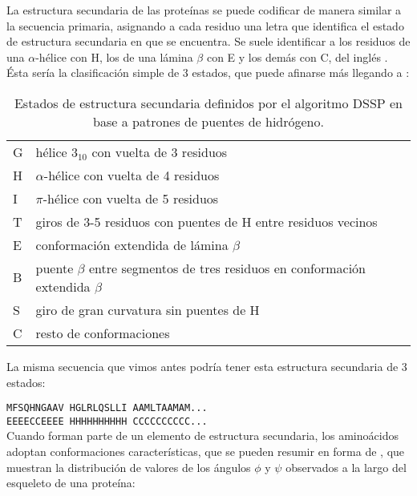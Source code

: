 La estructura secundaria de las prote\'{i}nas se puede codificar
de manera similar a la secuencia primaria, asignando a cada residuo una letra que identifica el estado de estructura secundaria en que se encuentra. 
Se suele identificar a los residuos de una $\alpha$-h\'{e}lice con H, los de una l\'{a}mina \(\beta\) con E y los dem\'{a}s 
con C, del ingl\'{e}s . \'{E}sta ser\'{i}a la clasificaci\'{o}n simple de 3 estados,
que puede afinarse m\'{a}s llegando a :

\begin{table}[h]
\begin{center}
\begin{scriptsize}
\begin{tabular}{|l|l|}\hline
G & h\'{e}lice $3_{10}$ con vuelta de 3 residuos\\   
H & $\alpha$-h\'{e}lice con vuelta de 4 residuos\\
I & $\pi$-h\'{e}lice con vuelta de 5 residuos\\ 
T & giros de 3-5 residuos con puentes de H entre residuos vecinos\\  
E & conformaci\'{o}n extendida de l\'{a}mina \(\beta\)\\
B & puente $\beta$ entre segmentos de tres residuos en conformaci\'{o}n extendida $\beta$\\      
S & giro de gran curvatura sin puentes de H\\    
C & resto de conformaciones\\   
\end{tabular}
\end{scriptsize}
\end{center}
\caption%
{
Estados de estructura secundaria definidos por el algoritmo DSSP en base a patrones de puentes de hidr\'{o}geno.
}
\label{tab:SS8}
\end{table} 

La misma secuencia que vimos antes podr\'{i}a tener esta estructura secundaria de 3 estados:

\texttt{MFSQHNGAAV HGLRLQSLLI AAMLTAAMAM...}\\
\texttt{EEEECCEEEE HHHHHHHHHH CCCCCCCCCC...}\\

Cuando forman parte de un elemento de estructura secundaria,
los amino\'{a}cidos adoptan conformaciones caracter\'{i}sticas, que se pueden resumir en forma de 
 \citep{Ramachandran1968}, 
que muestran la distribuci\'{o}n de valores de los \'{a}ngulos $\phi$ y $\psi$ observados a la largo del esqueleto de una prote\'{i}na:

